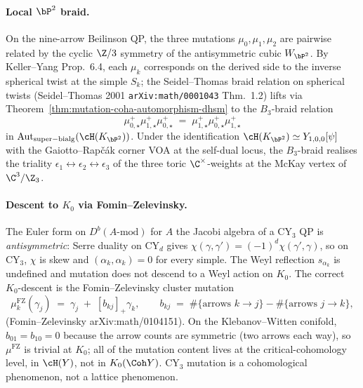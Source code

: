 \paragraph{Local $\bP^{2}$ braid.} On the nine-arrow Beilinson QP, the three mutations $\mu_0, \mu_1, \mu_2$ are pairwise related by the cyclic $\Z/3$ symmetry of the antisymmetric cubic $W_{\bP^2}$. By Keller--Yang Prop.~6.4, each $\mu_k$ corresponds on the derived side to the inverse spherical twist at the simple $S_k$; the Seidel--Thomas braid relation on spherical twists (Seidel--Thomas 2001 \texttt{arXiv:math/0001043} Thm.~1.2) lifts via Theorem~\ref{thm:mutation-coha-automorphism-dhsm} to the $B_3$-braid relation
\[
 \mu_{0, \star}^{+} \mu_{1, \star}^{+} \mu_{0, \star}^{+}
 \;=\;
 \mu_{1, \star}^{+} \mu_{0, \star}^{+} \mu_{1, \star}^{+}
\]
in $\mathrm{Aut}_{\mathrm{super{-}bialg}}(\cH(K_{\bP^2}))$. Under the identification $\cH(K_{\bP^2}) \simeq Y_{1, 0, 0}[\psi]$ with the Gaiotto--Rap\v{c}\'ak corner VOA at the self-dual locus, the $B_3$-braid realises the triality $\epsilon_1 \leftrightarrow \epsilon_2 \leftrightarrow \epsilon_3$ of the three toric $\C^{\times}$-weights at the McKay vertex of $\C^3 / \Z_3$.

\paragraph{Descent to $K_{0}$ via Fomin--Zelevinsky.} The Euler form on $D^{b}(A\text{-}\mathrm{mod})$ for $A$ the Jacobi algebra of a CY$_3$ QP is \emph{antisymmetric}: Serre duality on CY$_d$ gives $\chi(\gamma, \gamma') = (-1)^d \chi(\gamma', \gamma)$, so on CY$_3$, $\chi$ is skew and $(\alpha_k, \alpha_k) = 0$ for every simple. The Weyl reflection $s_{\alpha_k}$ is undefined and mutation does not descend to a Weyl action on $K_{0}$. The correct $K_{0}$-descent is the Fomin--Zelevinsky cluster mutation
\[
 \mu_k^{\mathrm{FZ}}(\gamma_j) \;=\; \gamma_j \;+\; [b_{kj}]_{+} \gamma_k,
 \qquad
 b_{kj} \;=\; \#\{\text{arrows } k \to j\} - \#\{\text{arrows } j \to k\},
\]
(Fomin--Zelevinsky arXiv:math/0104151). On the Klebanov--Witten conifold, $b_{01} = b_{10} = 0$ because the arrow counts are symmetric (two arrows each way), so $\mu^{\mathrm{FZ}}$ is trivial at $K_{0}$; all of the mutation content lives at the critical-cohomology level, in $\cH(Y)$, not in $K_{0}(\Coh Y)$. CY$_3$ mutation is a cohomological phenomenon, not a lattice phenomenon.

